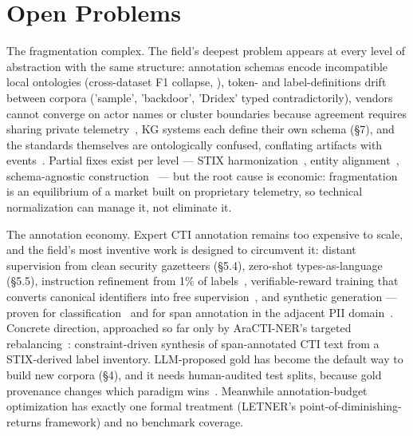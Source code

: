 \documentclass[11pt]{article}
\begin{document}
\section{Open Problems}

The fragmentation complex. The field's deepest problem appears at every level of abstraction with the same structure: annotation schemas encode incompatible local ontologies (cross-dataset F1 collapse, \citealp{jalocha2025label}), token- and label-definitions drift between corpora ('sample', 'backdoor', 'Dridex' typed contradictorily), vendors cannot converge on actor names or cluster boundaries because agreement requires sharing private telemetry~\citep{roa2025hesperus,ethembabaoglu2026apttodisagree}, KG systems each define their own schema (§7), and the standards themselves are ontologically confused, conflating artifacts with events~\citep{adams2026maecolite}. Partial fixes exist per level — STIX harmonization~\citep{echchammakhy2025cyberner}, entity alignment~\citep{cheng2024ctinexus}, schema-agnostic construction~\citep{kim2026schemaagnostic} — but the root cause is economic: fragmentation is an equilibrium of a market built on proprietary telemetry, so technical normalization can manage it, not eliminate it.

The annotation economy. Expert CTI annotation remains too expensive to scale, and the field's most inventive work is designed to circumvent it: distant supervision from clean security gazetteers (§5.4), zero-shot types-as-language (§5.5), instruction refinement from 1\% of labels~\citep{peng2025retrieval}, verifiable-reward training that converts canonical identifiers into free supervision~\citep{alam2026minerva}, and synthetic generation — proven for classification~\citep{ruizrdenas2025synthcti} and for span annotation in the adjacent PII domain~\citep{zaratiana2026gliner2pii}. Concrete direction, approached so far only by AraCTI-NER's targeted rebalancing~\citep{alghamdi2026aracti}: constraint-driven synthesis of span-annotated CTI text from a STIX-derived label inventory. LLM-proposed gold has become the default way to build new corpora (§4), and it needs human-audited test splits, because gold provenance changes which paradigm wins~\citep{chaganti2026ondevice}. Meanwhile annotation-budget optimization has exactly one formal treatment (LETNER's point-of-diminishing-returns framework) and no benchmark coverage.
\end{document}
